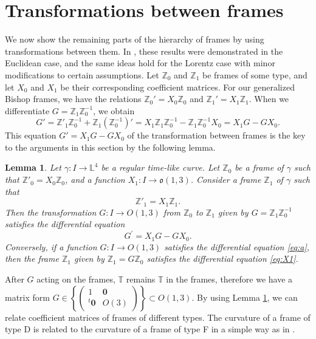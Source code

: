 \documentclass[a4paper]{amsart}
\newtheorem{lemma}[theorem]{Lemma}
\theoremstyle{definition}
\theoremstyle{remark}
\newcommand{\TT}{\mathbb{T}}
\newcommand{\ZZ}{\mathbb{Z}}
\newcommand{\LL}{\mathbb{L}}
\newcommand{\hG}{G}
\numberwithin{equation}{section}
\begin{document}
\section{Transformations between frames}
We now show the remaining parts of the hierarchy of frames by using transformations between them. In \cite{NN}, these results were demonstrated in the Euclidean case, and the same ideas hold for the Lorentz case with minor modifications to certain assumptions. Let $\ZZ_0$ and $\ZZ_1$ be frames of some type, and let $X_0$ and $X_1$ be their corresponding coefficient matrices. For our generalized Bishop frames, we have the relations $\ZZ_0' = X_0 \ZZ_0$ and $\ZZ_1' = X_1 \ZZ_1$. When we differentiate $\hG = \ZZ_1 \ZZ_0^{-1}$, we obtain 
\[
\hG' = \ZZ'_1 \ZZ_0^{-1} + \ZZ_1 (\ZZ_0^{-1})' = X_1 \ZZ_1\ZZ_0^{-1} - \ZZ_1 \ZZ_0^{-1} X_0 = X_{1}{\hG}-{\hG}X_{0}.  
\]
This equation $\hG' = X_{1}{\hG}-{\hG}X_{0}$ of the transformation between frames is the key to the arguments in this section by the following lemma.

\begin{lemma}\label{lem:1}
Let $\gamma : I \to \LL^{4}$ be a regular time-like curve. Let $\ZZ_0$ be a frame of $\gamma$ such that $\ZZ'_0 = X_0 \ZZ_0$, and a function $X_1 : I \to \mathfrak{o}(1,3)$. Consider a frame $\ZZ_1$ of $\gamma$ such that 
\begin{equation}\label{eq:X1}
\ZZ'_1 = X_1 \ZZ_1. 
\end{equation}
Then the transformation $\hG : I \to O (1,3)$ from $\ZZ_0$ to $\ZZ_1$ given by $\hG = \ZZ_1 \ZZ_0^{-1}$ satisfies the differential equation
\begin{equation}
\label{eq:a}{\hG}^{\prime}=X_{1}{\hG}-{\hG}X_{0}.
\end{equation}
Conversely, if a function $\hG : I \to O (1,3)$ satisfies the differential equation \eqref{eq:a}, then the frame $\ZZ_1$ given by $\ZZ_1=\hG \ZZ_0$ satisfies the differential equation \eqref{eq:X1}.
\end{lemma}

After $G$ acting  on the frames, $\TT$ remains $\TT$ in the frames, therefore we have a matrix form $G\in\left\{\begin{pmatrix}1&\bm{0}\\
^{t}\bm{0}&O(3)
\end{pmatrix}\right\}\subset O(1,3).$
By using Lemma \ref{lem:1}, we can relate coefficient matrices of frames of different types. The curvature of a frame of type D is related to the curvature of a frame of type F in a simple way as in \cite{NN}.
\end{document}
